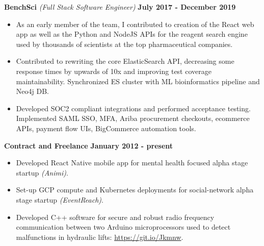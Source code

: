 \documentclass{article}
\begin{document}
{\bf  BenchSci } \textit{(Full Stack Software Engineer)} \hfill {\bf July 2017 - December 2019 \/}
\begin{itemize}[leftmargin=*]
    \itemsep0em
    \renewcommand\labelitemi{\tiny$\bullet$}
    \item As an early member of the team, I contributed to creation of the React web app as well as the Python and NodeJS APIs for the reagent search engine used by thousands of scientists at the top pharmaceutical companies.
    \item Contributed to rewriting the core ElasticSearch API, decreasing some response times by upwards of 10x and improving test coverage maintainability. Synchronized ES cluster with ML bioinformatics pipeline and Neo4j DB.
    \item Developed SOC2 compliant integrations and performed acceptance testing. Implemented SAML SSO, MFA, Ariba procurement checkouts, ecommerce APIs, payment flow UIs, BigCommerce automation tools.

\end{itemize}


{\bf Contract and Freelance} \hfill {\bf January 2012 - present\/} 
\begin{itemize}[leftmargin=*]
    \itemsep0em
    \renewcommand\labelitemi{\tiny$\bullet$}
    \item Developed React Native mobile app for mental health focused alpha stage startup \textit{(Animi)}.
    \item Set-up GCP compute and Kubernetes deployments for social-network alpha stage startup \textit{(EventReach)}. 
    \item Developed C++ software for secure and robust radio frequency communication between two Arduino microprocessors used to detect malfunctions in hydraulic lifts: \url{https://git.io/Jkmnw}.
\end{itemize}
\end{document}
